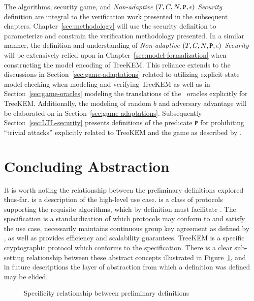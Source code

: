 The  algorithms, security game, and \emph{Non-adaptive} \((T, C, N, \textbf{\texttt{P}}, \epsilon)\) \emph{ Security} definition are integral to the verification work presented in the subsequent chapters.
Chapter\ \ref{sec:methodology} will use the security definition to parameterize and constrain the verification methodology presented.
In a similar manner, the definition and understanding of \emph{Non-adaptive} \((T, C, N, \textbf{\texttt{P}}, \epsilon)\) \emph{ Security} will be extensively relied upon in Chapter\ \ref{sec:model-formalization} when constructing the model encoding of TreeKEM.\@
This reliance extends to the discussions in Section\ \ref{sec:game-adaptations} related to utilizing explicit state model checking when modeling and verifying TreeKEM
as well as in Section\ \ref{sec:game-oracles} modeling the translations of the \CGKAsec\ oracles explicitly for TreeKEM.\@
Additionally, the modeling of random \(b\) and adversary advantage will be elaborated on in Section\ \ref{sec:game-adaptations}.
Subsequently Section\ \ref{sec:LTL-security} presents definitions of the predicate \textbf{\texttt{P}} for prohibiting ``trivial attacks'' explicitly related to TreeKEM and the  game as described by \autocite{alwen2020security}.


\hypertarget{sec:concluding-abstraction}{%
\section{Concluding Abstraction}\label{sec:concluding-abstraction}}

It is worth noting the relationship between the preliminary definitions explored thus-far.
 is a description of the high-level use case.
 is a class of protocols supporting the requisite algorithms, which by definition must facilitate .
The  specification is a standardization of which protocols may conform to and satisfy the  use case, necessarily maintains continuous group key agreement as defined by , as well as provides efficiency and scalability guarantees.
TreeKEM is a specific cryptographic protocol which conforms to the  specification.
There is a clear sub-setting relationship between these abstract concepts illustrated in Figure\ \ref{fig:venn-protocols}, and in future descriptions the layer of abstraction from which a definition was defined may be elided.

\begin{figure}
\centering
\caption{\label{fig:venn-protocols}Specificity relationship between preliminary definitions}
\end{figure}

